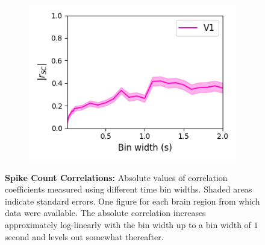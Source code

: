\documentclass[a4paper,12pt]{article}
\theoremstyle{definition}
\begin{document}
\begin{figure}[p]
\begin{subfigure}{0.5\textwidth}
    \includegraphics[width=\textwidth]{figures/linear_bin_width_correlations_v1_6.png}
  \end{subfigure}
  \caption{\textbf{Spike Count Correlations:} Absolute values of correlation coefficients measured using different time bin widths. Shaded areas indicate standard errors. One figure for each brain region from which data were available. The absolute correlation increases approximately log-linearly with the bin width up to a bin width of $1$ second and levels out somewhat thereafter.}
  \label{fig:linear_bin_width_vs_correlation_by_region}
\end{figure}
\end{document}
